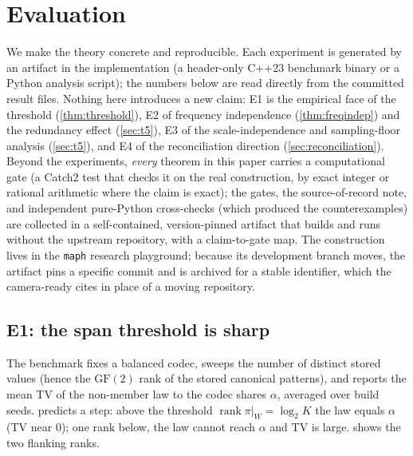 \documentclass[acmsmall,review]{acmart}
\newcommand{\GF}{\mathrm{GF}(2)}
\DeclareMathOperator{\rank}{rank}
\newcommand{\W}{W}                          %
\newcommand{\proj}{\pi}                     %
\newcommand{\al}{\alpha}                    %
\begin{document}
\section{Evaluation}
\label{sec:experiments}

We make the theory concrete and reproducible. Each experiment is generated by an artifact
in the implementation (a header-only C++23 benchmark binary or a Python analysis script);
the numbers below are read directly from the committed result files. Nothing here
introduces a new claim: E1 is the empirical face of the threshold (\cref{thm:threshold}),
E2 of frequency independence (\cref{thm:freqindep}) and the redundancy effect
(\cref{sec:t5}), E3 of the scale-independence and sampling-floor analysis (\cref{sec:t5}),
and E4 of the reconciliation direction (\cref{sec:reconciliation}). Beyond the experiments,
\emph{every} theorem in this paper carries a computational gate (a Catch2 test that checks it
on the real construction, by exact integer or rational arithmetic where the claim is exact);
the gates, the source-of-record note, and independent pure-Python cross-checks (which produced
the counterexamples) are collected in a self-contained, version-pinned artifact that builds and
runs without the upstream repository, with a claim-to-gate map. The construction lives in the
\texttt{maph} research playground; because its development branch moves, the artifact pins a
specific commit and is archived for a stable identifier, which the camera-ready cites in place
of a moving repository.

\subsection{E1: the span threshold is sharp}

The benchmark fixes a balanced codec, sweeps the number of distinct stored values (hence
the $\GF$ rank of the stored canonical patterns), and reports the mean TV of the
non-member law to the codec shares $\al$, averaged over build seeds. 
predicts a step: above the threshold $\rank \proj|_{\W} = \log_2 K$ the law equals $\al$
(TV near $0$); one rank below, the law cannot reach $\al$ and TV is large.
 shows the two flanking ranks.
\end{document}
